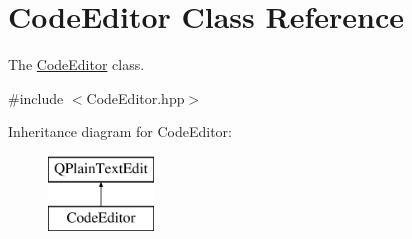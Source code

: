 \hypertarget{classCodeEditor}{\section{Code\+Editor Class Reference}
\label{classCodeEditor}
}


The \hyperlink{classCodeEditor}{Code\+Editor} class.  




{\ttfamily \#include $<$Code\+Editor.\+hpp$>$}

Inheritance diagram for Code\+Editor\+:\begin{figure}[H]
\begin{center}
\leavevmode
\includegraphics[height=2.000000cm]{classCodeEditor}
\end{center}
\end{figure}
